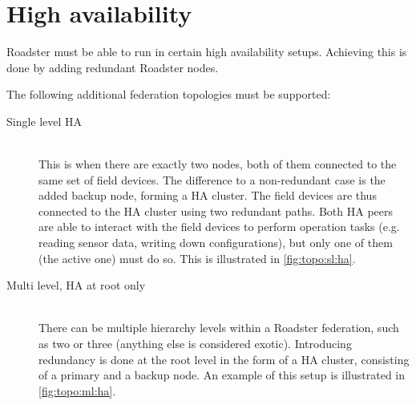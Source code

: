 \section{High availability}
Roadster must be able to run in certain high availability setups. Achieving
this is done by adding redundant Roadster nodes.

The following additional federation topologies must be supported:
\begin{description}
	\item [ Single level \gls{HA} ] \hfill\\
		This is when there are exactly two nodes, both of them
		connected to the same set of field devices. The difference to a
		non-redundant case is the added backup node, forming a HA
		cluster. The field devices are thus connected to the HA cluster
		using two redundant paths. Both HA peers are able to interact
		with the field devices to perform operation tasks (e.g. reading
		sensor data, writing down configurations), but only one of them
		(the active one) must do so. This is illustrated in
		\autoref{fig:topo:sl:ha}.

	\item [ Multi level, \gls{HA} at root only ] \hfill\\
		There can be multiple hierarchy levels within a Roadster federation, such as two or
		three (anything else is considered exotic). Introducing
		redundancy is done at the root level in the form of a HA
		cluster, consisting of a primary and a backup node. An example of this setup is illustrated in
		\autoref{fig:topo:ml:ha}.
\end{description}

